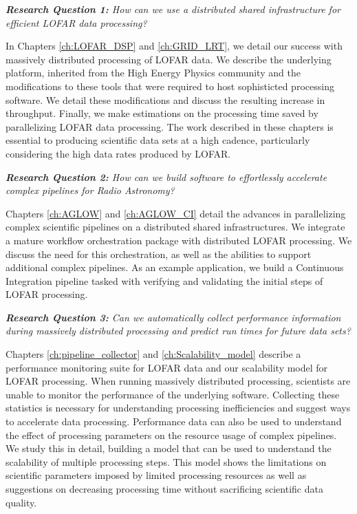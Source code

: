 \begin{addmargin}[4em]{8em}%
    \emph{\textbf{Research Question 1:} How can we use a distributed shared infrastructure for efficient LOFAR data processing?}
\end{addmargin}

In Chapters \ref{ch:LOFAR_DSP} and \ref{ch:GRID_LRT}, we detail our success with massively distributed processing of LOFAR data. We describe the underlying platform, inherited from the High Energy Physics community and the modifications to these tools that were required to host sophisticted processing software. We detail these modifications and discuss the resulting increase in throughput. Finally, we make estimations on the processing time saved by parallelizing LOFAR data processing. The work described in these chapters is essential to producing scientific data sets at a high cadence, particularly considering the high data rates produced by LOFAR.  


\begin{addmargin}[4em]{8em}%
    \emph{\textbf{Research Question 2:}  How can we build software to effortlessly accelerate complex pipelines for Radio Astronomy?} 
\end{addmargin}

Chapters \ref{ch:AGLOW} and \ref{ch:AGLOW_CI} detail the advances in parallelizing complex scientific pipelines on a distributed shared infrastructures. We integrate a mature workflow orchestration package with distributed LOFAR processing. We discuss the need for this orchestration, as well as the abilities to support additional complex pipelines. As an example application, we build a Continuous Integration pipeline tasked with verifying and validating the initial steps of LOFAR processing. 


\begin{addmargin}[4em]{8em}%
    \emph{\textbf{Research Question 3:} Can we automatically collect performance information during massively distributed processing and predict run times for future data sets?}
\end{addmargin}

Chapters \ref{ch:pipeline_collector} and \ref{ch:Scalability_model} describe a performance monitoring suite for LOFAR data and our scalability model for LOFAR processing. When running massively distributed processing, scientists are unable to monitor the performance of the underlying software. Collecting these statistics is necessary for understanding processing inefficiencies and suggest ways to accelerate data processing. Performance data can also be used to understand the effect of processing parameters on the resource usage of complex pipelines. We study this in detail, building a model that can be used to understand the scalability of multiple processing steps. This model shows the limitations on scientific parameters imposed by limited processing resources as well as suggestions on decreasing processing time without sacrificing scientific data quality. 

